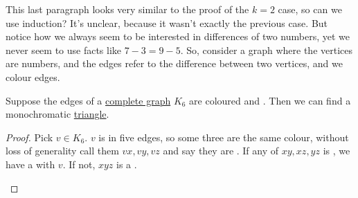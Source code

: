 \documentclass{article}
\begin{document}
This last paragraph looks very similar to the proof of the $k=2$ case, so can we use induction? It's unclear, because it wasn't exactly the previous case.  But notice how we always seem to be interested in differences of two numbers, yet we never seem to use facts like $7-3 = 9-5$.
So, consider a graph where the vertices are numbers, and the edges refer to the difference between two vertices, and we colour edges.

Suppose the edges of a \hyperlink{def:Kn}{complete graph} $K_6$ are coloured  and . Then we can find a monochromatic \hyperref[def:triangle]{triangle}.
\begin{proof}
    Pick $v \in K_6$. $v$ is in five edges, so some three are the same colour, without loss of generality call them $vx, vy, vz$ and say they are .
    If any of $xy, xz, yz$ is , we have a  with $v$.
    If not, $xyz$ is a .
    \begin{center}
    \end{center}
\end{proof}
\end{document}
